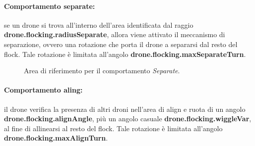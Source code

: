 \paragraph{Comportamento separate:} se un drone si trova all'interno dell'area identificata dal raggio \textbf{drone.flocking.radiusSeparate}, allora viene attivato il meccanismo di separazione, ovvero una rotazione che porta il drone a separarsi dal resto del flock.
Tale rotazione è limitata all'angolo \textbf{drone.flocking.maxSeparateTurn}.

\begin{figure}[H] 
    \captionsetup{justification=centering, margin=2cm, font=footnotesize}
    \begin{center}
    \end{center}
    \caption{Area di riferimento per il comportamento \textit{Separate}.}
    \label{separate}
\end{figure}

\paragraph{Comportamento aling:} il drone verifica la presenza di altri droni nell'area di align e ruota di un angolo \textbf{drone.flocking.alignAngle}, più un angolo casuale \textbf{drone.flocking.wiggleVar}, al fine di allinearsi al resto del flock.
Tale rotazione è limitata all'angolo  \textbf{drone.flocking.maxAlignTurn}.

